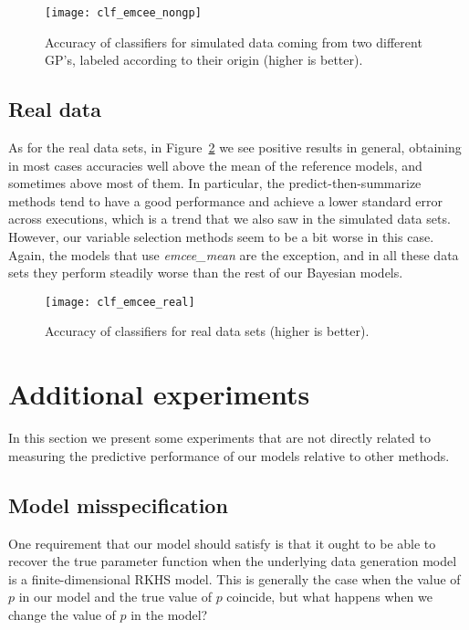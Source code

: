 \begin{figure}[htbp!]
  \centering
  \texttt{[image: clf\_emcee\_nongp]}
  \caption{Accuracy of classifiers for simulated data coming from two different GP's, labeled according to their origin (higher is better).}\label{fig:clf_emcee_nongp}
\end{figure}

\subsection*{Real data}

As for the real data sets, in Figure~\ref{fig:clf_emcee_real} we see positive results in general, obtaining in most cases accuracies well above the mean of the reference models, and sometimes above most of them. In particular, the predict-then-summarize methods tend to have a good performance and achieve a lower standard error across executions, which is a trend that we also saw in the simulated data sets. However, our variable selection methods seem to be a bit worse in this case. Again, the models that use \textit{emcee\_mean} are the exception, and in all these data sets they perform steadily worse than the rest of our Bayesian models.

\begin{figure}[ht!]
  \centering
  \texttt{[image: clf\_emcee\_real]}
  \caption{Accuracy of classifiers for real data sets (higher is better).}\label{fig:clf_emcee_real}
\end{figure}


\section{Additional experiments}

In this section we present some experiments that are not directly related to measuring the predictive performance of our models relative to other methods.

\subsection*{Model misspecification}

One requirement that our model should satisfy is that it ought to be able to recover the true parameter function when the underlying data generation model is a finite-dimensional RKHS model. This is generally the case when the value of \(p\) in our model and the true value of \(p\) coincide, but what happens when we change the value of \(p\) in the model?

